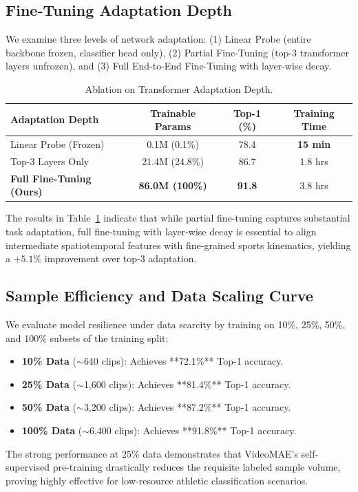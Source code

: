 \subsection{Fine-Tuning Adaptation Depth}
We examine three levels of network adaptation: (1) Linear Probe (entire backbone frozen, classifier head only), (2) Partial Fine-Tuning (top-3 transformer layers unfrozen), and (3) Full End-to-End Fine-Tuning with layer-wise decay.

\begin{table}[htbp]
\caption{Ablation on Transformer Adaptation Depth.}
\label{tab:ablation_depth}
\centering
\begin{tabular}{lccc}
\toprule
\textbf{Adaptation Depth} & \textbf{Trainable Params} & \textbf{Top-1 (\%)} & \textbf{Training Time} \\
\midrule
Linear Probe (Frozen)     & 0.1M (0.1\%)  & 78.4 & \textbf{15 min} \\
Top-3 Layers Only         & 21.4M (24.8\%) & 86.7 & 1.8 hrs \\
\textbf{Full Fine-Tuning (Ours)} & \textbf{86.0M (100\%)} & \textbf{91.8} & 3.8 hrs \\
\bottomrule
\end{tabular}
\end{table}

The results in Table~\ref{tab:ablation_depth} indicate that while partial fine-tuning captures substantial task adaptation, full fine-tuning with layer-wise decay is essential to align intermediate spatiotemporal features with fine-grained sports kinematics, yielding a $+5.1\%$ improvement over top-3 adaptation.

\subsection{Sample Efficiency and Data Scaling Curve}
We evaluate model resilience under data scarcity by training on 10\%, 25\%, 50\%, and 100\% subsets of the training split:
\begin{itemize}
    \item \textbf{10\% Data} ($\sim$640 clips): Achieves **72.1\%** Top-1 accuracy.
    \item \textbf{25\% Data} ($\sim$1,600 clips): Achieves **81.4\%** Top-1 accuracy.
    \item \textbf{50\% Data} ($\sim$3,200 clips): Achieves **87.2\%** Top-1 accuracy.
    \item \textbf{100\% Data} ($\sim$6,400 clips): Achieves **91.8\%** Top-1 accuracy.
\end{itemize}
The strong performance at 25\% data demonstrates that VideoMAE's self-supervised pre-training drastically reduces the requisite labeled sample volume, proving highly effective for low-resource athletic classification scenarios.
